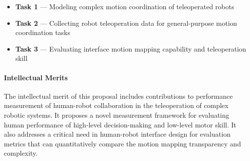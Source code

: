 \begin{itemize}

\item \textbf{Task 1} --- Modeling complex motion coordination of teleoperated robots


\item \textbf{Task 2} --- Collecting robot teleoperation data for general-purpose motion coordination tasks  


\item \textbf{Task 3} --- Evaluating interface motion mapping capability and teleoperation skill



\end{itemize}

\paragraph*{Intellectual Merits}
The intellectual merit of this proposal includes contributions to performance measurement of human-robot collaboration in the teleoperation of complex robotic systems. It proposes a novel measurement framework for evaluating human performance of high-level decision-making and low-level motor skill. It also addresses a critical need in human-robot interface design for evaluation metrics that can quantitatively compare the motion mapping transparency and complexity.

